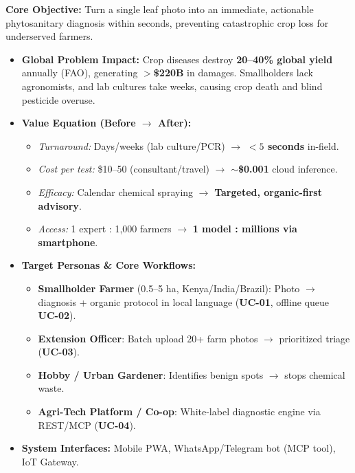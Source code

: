 \documentclass[8pt]{article}
\begin{document}
\noindent%
\begin{minipage}[t]{0.327\linewidth}%
  \begin{tcolorbox}[
    canvasbox,
    colback=bgValue,
    colframe=headValue,
    title={1. VALUE PROPOSITION},
    boxed title style={colback=headValue},
    height=68mm
  ]
  \fontsize{7.2pt}{8.8pt}\selectfont
  \textbf{Core Objective:} Turn a single leaf photo into an immediate, actionable phytosanitary diagnosis within seconds, preventing catastrophic crop loss for underserved farmers.
  \vspace{1mm}
  \begin{itemize}
    \item \textbf{Global Problem Impact:} Crop diseases destroy \textbf{20--40\% global yield} annually (FAO), generating $>$\textbf{\$220B} in damages. Smallholders lack agronomists, and lab cultures take weeks, causing crop death and blind pesticide overuse.
    \item \textbf{Value Equation (Before $\rightarrow$ After):}
      \begin{itemize}[label={\textcolor{headValue}{$\rightarrow$}}]
        \item \emph{Turnaround:} Days/weeks (lab culture/PCR) $\rightarrow$ \textbf{$<5$ seconds} in-field.
        \item \emph{Cost per test:} \$10--50 (consultant/travel) $\rightarrow$ \textbf{$\sim$\$0.001} cloud inference.
        \item \emph{Efficacy:} Calendar chemical spraying $\rightarrow$ \textbf{Targeted, organic-first advisory}.
        \item \emph{Access:} 1 expert : 1,000 farmers $\rightarrow$ \textbf{1 model : millions via smartphone}.
      \end{itemize}
    \item \textbf{Target Personas \& Core Workflows:}
      \begin{itemize}
        \item \textbf{Smallholder Farmer} (0.5--5 ha, Kenya/India/Brazil): Photo $\rightarrow$ diagnosis + organic protocol in local language (\textbf{UC-01}, offline queue \textbf{UC-02}).
        \item \textbf{Extension Officer}: Batch upload 20+ farm photos $\rightarrow$ prioritized triage (\textbf{UC-03}).
        \item \textbf{Hobby / Urban Gardener}: Identifies benign spots $\rightarrow$ stops chemical waste.
        \item \textbf{Agri-Tech Platform / Co-op}: White-label diagnostic engine via REST/MCP (\textbf{UC-04}).
      \end{itemize}
    \item \textbf{System Interfaces:} Mobile PWA, WhatsApp/Telegram bot (MCP tool), IoT Gateway.
  \end{itemize}
  \end{tcolorbox}%
\end{minipage}\hfill%
\end{document}
